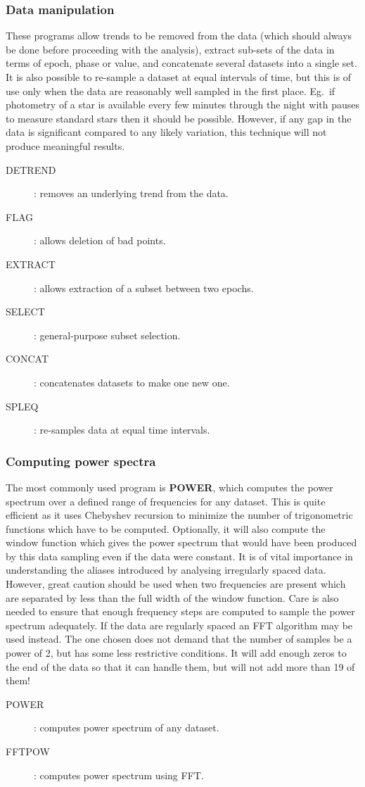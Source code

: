 \subsubsection {Data manipulation}
These programs allow trends to be removed from the data (which should always be
done before proceeding with the analysis), extract sub-sets of the data in
terms of epoch, phase or value, and concatenate several datasets into a single
set.
It is also possible to re-sample a dataset at equal intervals of time, but this
is of use only when the data are reasonably well sampled in the first place.
Eg.\ if photometry of a star is available every few minutes through the night
with pauses to measure standard stars then it should be possible.
However, if any gap in the data is significant compared to any likely variation,
this technique will not produce meaningful results.
\begin{description}
\item [DETREND]: removes an underlying trend from the data.
\item [FLAG]: allows deletion of bad points.
\item [EXTRACT]: allows extraction of a subset between two epochs.
\item [SELECT]: general-purpose subset selection.
\item [CONCAT]: concatenates datasets to make one new one.
\item [SPLEQ]: re-samples data at equal time intervals.
\end{description}
\subsubsection {Computing power spectra}
The most commonly used program is {\bf POWER}, which computes the power spectrum
over a defined range of frequencies for any dataset.
This is quite efficient as it uses Chebyshev recursion to minimize the number of
trigonometric functions which have to be computed.
Optionally, it will also compute the window function which gives the power
spectrum that would have been produced by this data sampling even if the data
were constant.
It is of vital importance in understanding the aliases introduced by analysing
irregularly spaced data.
However, great caution should be used when two frequencies are present which are
separated by less than the full width of the window function.
Care is also needed to ensure that enough frequency steps are computed to sample
the power spectrum adequately.
If the data are regularly spaced an FFT algorithm may be used instead.
The one chosen does not demand that the number of samples be a power of 2, but
has some less restrictive conditions.
It will add enough zeros to the end of the data so that it can handle them, but
will not add more than 19 of them!
\begin{description}
\item [POWER]: computes power spectrum of any dataset.
\item [FFTPOW]: computes power spectrum using FFT.
\end{description}

